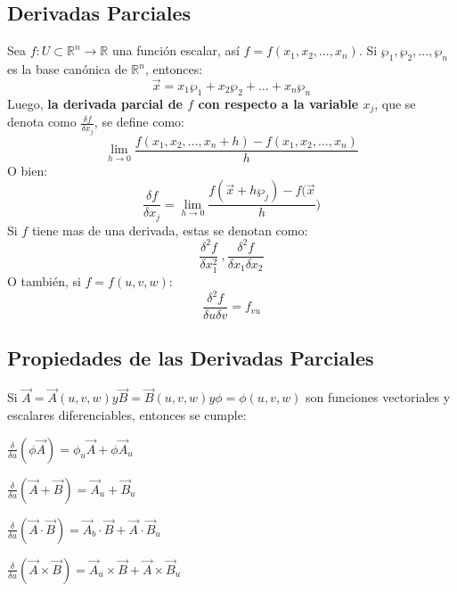 \documentclass[a4paper]{article}
\begin{document}
\subsection{Derivadas Parciales}
Sea $f:U\subset\mathbb{R}^n\longrightarrow\mathbb{R}$ una función escalar, así $f=f(x_1,x_2,\ldots,x_n)$. Si ${\wp_1,\wp_2,\ldots,\wp_n}$ es la base canónica de $\mathbb{R}^n$, entonces:
\[\vec{x}=x_1\wp_1+x_2\wp_2+\ldots+x_n\wp_n\]
Luego, \textbf{la derivada parcial de $f$ con respecto a la variable $x_j$}, que se denota como $\frac{\delta f}{\delta x_j}$, se define como:
\[\lim_{h\rightarrow 0} \frac{f(x_1,x_2,\ldots,x_n+h)-f(x_1,x_2,\ldots,x_n)}{h}\]
O bien:
\[\frac{\delta f}{\delta x_j}=\lim_{h\rightarrow 0}\frac{f(\vec{x}+h\wp_j)-f(\vec{x}}{h})\]
Si $f$ tiene mas de una derivada, estas se denotan como:
\[\frac{\delta^2 f}{\delta x_1^2}\ ,\frac{\delta^2 f}{\delta x_1 \delta x_2}\]
O también, si $f=f(u,v,w)$:
\[\frac{\delta^2 f}{\delta u \delta v}=f_{vu}\]
\subsection{Propiedades de las Derivadas Parciales}
Si $\vec{A}=\vec{A}(u,v,w) y\vec{B}=\vec{B}(u,v,w) y \phi=\phi(u,v,w)$ son funciones vectoriales y escalares diferenciables, entonces se cumple:
\begin{enumerate}
{\item $\frac{\delta}{\delta u}(\phi\vec{A})=\phi_u\vec{A}+\phi\vec{A}_u$}
{\item $\frac{\delta}{\delta u}(\vec{A}+\vec{B})=\vec{A}_u+\vec{B}_u$}
{\item $\frac{\delta}{\delta u}(\vec{A}\cdot\vec{B})=\vec{A}_b\cdot\vec{B}+\vec{A}\cdot\vec{B}_u$}
{\item $\frac{\delta}{\delta u}(\vec{A}\times\vec{B})=\vec{A}_u\times\vec{B}+\vec{A}\times\vec{B}_u$}
\end{enumerate}
\end{document}
